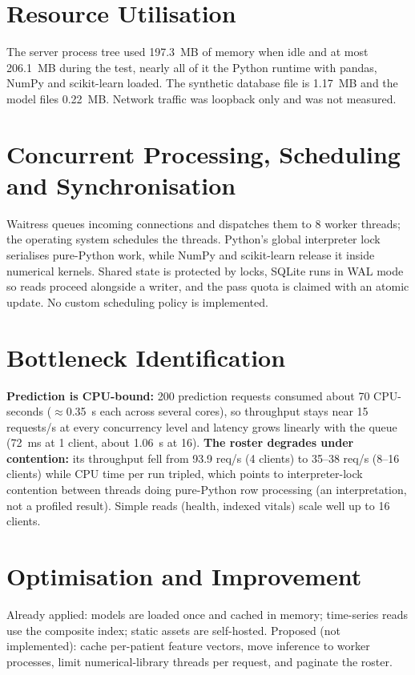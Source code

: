\section{Resource Utilisation}
The server process tree used 197.3~MB of memory when idle and at most 206.1~MB during the test, nearly all
of it the Python runtime with pandas, NumPy and scikit-learn loaded. The synthetic database file is
1.17~MB and the model files 0.22~MB. Network traffic was loopback only and was not measured.

\section{Concurrent Processing, Scheduling and Synchronisation}
Waitress queues incoming connections and dispatches them to 8 worker threads; the operating system
schedules the threads. Python's global interpreter lock serialises pure-Python work, while NumPy and
scikit-learn release it inside numerical kernels. Shared state is protected by locks, SQLite runs in WAL
mode so reads proceed alongside a writer, and the pass quota is claimed with an atomic update. No custom
scheduling policy is implemented.

\section{Bottleneck Identification}
\label{sec:bottleneck}
\textbf{Prediction is CPU-bound:} 200 prediction requests consumed about 70 CPU-seconds
($\approx$0.35~s each across several cores), so throughput stays near 15 requests/s at every
concurrency level and latency grows linearly with the queue (72~ms at 1 client, about 1.06~s at 16).
\textbf{The roster degrades under contention:} its throughput fell from 93.9 req/s (4 clients) to 35--38
req/s (8--16 clients) while CPU time per run tripled, which points to interpreter-lock contention between
threads doing pure-Python row processing (an interpretation, not a profiled result). Simple reads (health,
indexed vitals) scale well up to 16 clients.

\section{Optimisation and Improvement}
Already applied: models are loaded once and cached in memory; time-series reads use the composite index;
static assets are self-hosted. Proposed (not implemented): cache per-patient feature vectors, move
inference to worker processes, limit numerical-library threads per request, and paginate the roster.

